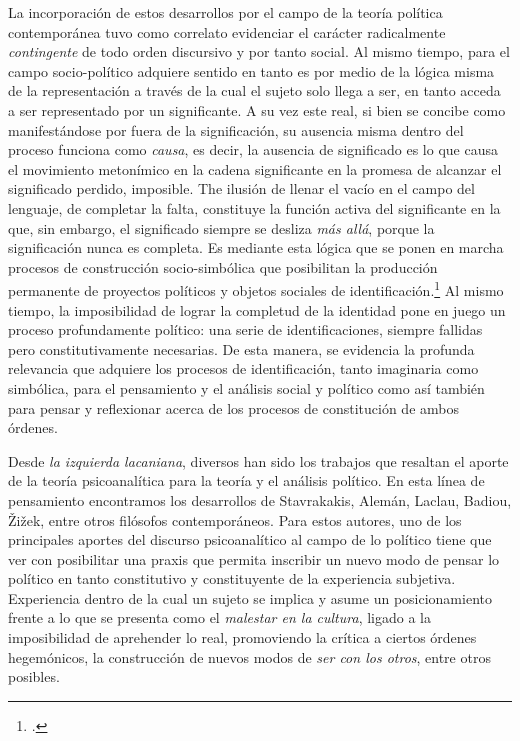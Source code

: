 La incorporación de estos desarrollos por el campo de la teoría política contemporánea tuvo como correlato evidenciar el carácter radicalmente \emph{contingente} de todo orden discursivo y por tanto social. Al mismo tiempo, para el campo socio-político adquiere sentido en tanto es por medio de la lógica misma de la representación a través de la cual el sujeto solo llega a ser, en tanto acceda a ser representado por un significante. A su vez este real, si bien se concibe como manifestándose por fuera de la significación, su ausencia misma dentro del proceso funciona como \emph{causa}, es decir, la ausencia de significado es lo que causa el movimiento metonímico en la cadena significante en la promesa de alcanzar el significado perdido, imposible. The ilusión de llenar el vacío en el campo del lenguaje, de completar la falta, constituye la función activa del significante en la que, sin embargo, el significado siempre se desliza \emph{más allá}, porque la significación nunca es completa. Es mediante esta lógica que se ponen en marcha procesos de construcción socio-simbólica que posibilitan la producción permanente de proyectos políticos y objetos sociales de identificación.\footnote{\cite[]{@7107-STAVRAKAKIS2007}.} Al mismo tiempo, la imposibilidad de lograr la completud de la identidad pone en juego un proceso profundamente político: una serie de identificaciones, siempre fallidas pero constitutivamente necesarias. De esta manera, se evidencia la profunda relevancia que adquiere los procesos de identificación, tanto imaginaria como simbólica, para el pensamiento y el análisis social y político como así también para pensar y reflexionar acerca de los procesos de constitución de ambos órdenes.

Desde \emph{la izquierda lacaniana}, diversos han sido los trabajos que resaltan el aporte de la teoría psicoanalítica para la teoría y el análisis político. En esta línea de pensamiento encontramos los desarrollos de Stavrakakis, Alemán, Laclau, Badiou, Žižek, entre otros filósofos contemporáneos. Para estos autores, uno de los principales aportes del discurso psicoanalítico al campo de lo político tiene que ver con posibilitar una praxis que permita inscribir un nuevo modo de pensar lo político en tanto constitutivo y constituyente de la experiencia subjetiva. Experiencia dentro de la cual un sujeto se implica y asume un posicionamiento frente a lo que se presenta como el \emph{malestar en la cultura}, ligado a la imposibilidad de aprehender lo real, promoviendo la crítica a ciertos órdenes hegemónicos, la construcción de nuevos modos de \emph{ser con los otros}, entre otros posibles.


